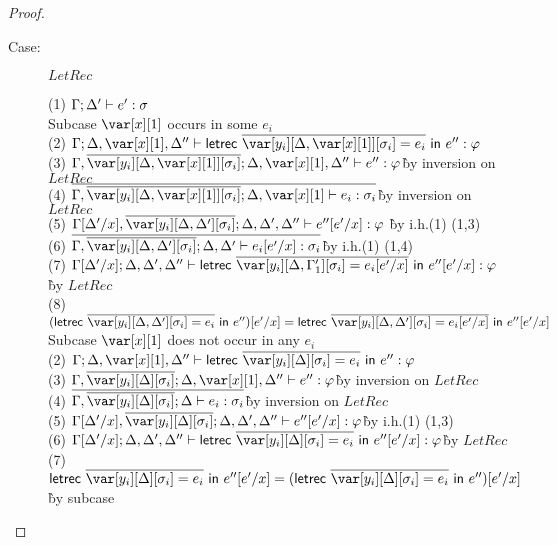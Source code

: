\begin{proof}
\begin{description}
\item[Case:] $LetRec$
\begin{tabbing}
  (1) $\Gamma; \Delta' \vdash e' : \sigma$\\
  Subcase $\xl$ occurs in some $e_i$\\
  (2) $\G; \D, \xl, \D'' \vdash \lletrec{\ov{\var[y_i][\D,\xl][\s_i] = e_i}}{e''} : \vp$\\
  (3) $\G, \ov{\var[y_i][\D,\xl][\s_i]}; \D, \xl, \D'' \vdash e'' : \vp$\` by inversion on $LetRec$\\
  (4) $\ov{\G,\ov{\var[y_i][\D, \xl][\s_i]}; \D, \xl \vdash e_i : \s_i}$\` by inversion on $LetRec$\\
  (5) $\G[\D'/x], \ov{\var[y_i][\D, \D'][\s_i]}; \D, \D', \D'' \vdash e''[e'/x] : \vp$ \` by i.h.(1) (1,3)\\
  (6) $\ov{\G, \ov{\var[y_i][\D, \D'][\s_i]}; \D, \D' \vdash e_i[e'/x] : \s_i}$\` by i.h.(1) (1,4)\\
  (7) $\G[\D'/x]; \D, \D', \D'' \vdash \lletrec{\ov{\var[y_i][\D,\G'_1][\s_i] = e_i[e'/x]}}{e''[e'/x]} : \vp$\` by $LetRec$\\
  (8) $(\lletrec{\ov{\var[y_i][\D,\D'][\s_i] = e_i}}{e''})[e'/x] = \lletrec{\ov{\var[y_i][\D,\D'][\s_i] = e_i[e'/x]}}{e''[e'/x]}$\\
  Subcase $\xl$ does not occur in any $e_i$\\
  (2) $\G; \D, \xl, \D'' \vdash \lletrec{\ov{\var[y_i][\D][\s_i] = e_i}}{e''} : \vp$\\
  (3) $\G, \ov{\var[y_i][\D][\s_i]}; \D, \xl, \D'' \vdash e'' : \vp$\` by inversion on $LetRec$\\
  (4) $\ov{\G, \ov{\var[y_i][\D][\s_i]}; \D \vdash e_i : \s_i}$\` by inversion on $LetRec$\\
  (5) $\G[\D'/x], \ov{\var[y_i][\D][\s_i]}; \D, \D', \D'' \vdash e''[e'/x] : \vp$\` by i.h.(1) (1,3)\\
  (6) $\G[\D'/x]; \D, \D', \D'' \vdash \lletrec{\ov{\var[y_i][\D][\s_i] = e_i}}{e''[e'/x]} : \vp$\` by $LetRec$\\
  (7) $\lletrec{\ov{\var[y_i][\D][\s_i] = e_i}}{e''[e'/x]} = (\lletrec{\ov{\var[y_i][\D][\s_i] = e_i}}{e''})[e'/x]$\` by subcase\\
\end{tabbing}


\end{description}
\end{proof}
